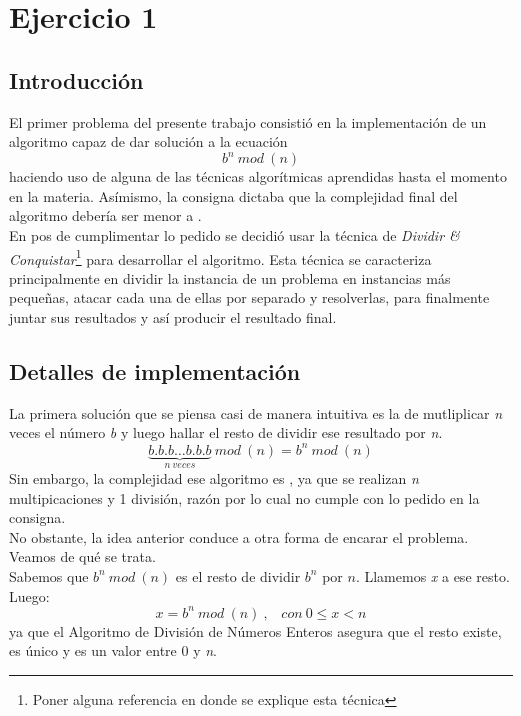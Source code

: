 \section*{Ejercicio 1}

\subsection*{Introducción}
	El primer problema del presente trabajo consistió en la implementación de un algoritmo capaz de dar solución a la ecuación 
	\begin{equation} 
		b^n\ mod\ (n) 
	\end{equation} 
haciendo uso de alguna de las técnicas algorítmicas aprendidas hasta el momento en la materia. Asímismo, la consigna dictaba que la complejidad final del algoritmo debería ser menor a .\\
	En pos de cumplimentar lo pedido se decidió usar la técnica de \textit{Dividir \& Conquistar}\footnote{Poner alguna referencia 	en donde se explique esta técnica} para desarrollar el algoritmo. Esta técnica se caracteriza principalmente en dividir la instancia de un problema en instancias más pequeñas, atacar cada una de ellas por separado y resolverlas, para finalmente juntar sus resultados y así producir el resultado final.

\subsection*{Detalles de implementación}
	La primera solución que se piensa casi de manera intuitiva es la de mutliplicar \textit{n} veces el número \textit{b} y luego hallar el resto de dividir ese resultado por \textit{n}. 
	\begin{equation}
		\underbrace{b.b.b \hdots b.b.b}_{n\ veces}\ mod\ (n)  = b^n\ mod\ (n)
	\end{equation}
Sin embargo, la complejidad ese algoritmo es , ya que se realizan \textit{n} multipicaciones y 1 división, razón por lo cual no cumple con lo pedido en la consigna.\\
No obstante, la idea anterior conduce a otra forma de encarar el problema. Veamos de qué se trata. \\

	Sabemos que $b^n\ mod\ (n)$ es el resto de dividir $b^n$ por $n$. Llamemos \textit{x} a ese resto. Luego: 
	\begin{equation}
		 x = b^n\ mod\ (n)\ , \hspace{10pt}con\ 0 \leq x < n
	\end{equation}
ya que el Algoritmo de División de Números Enteros asegura que el resto existe, es único y es un valor entre 0 y \textit{n}.\\


